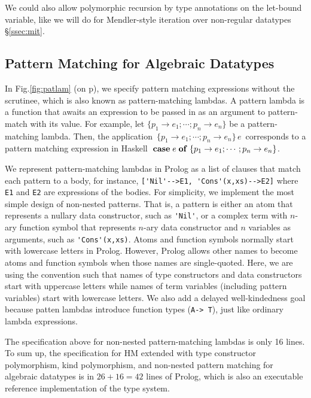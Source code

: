 \documentclass[runningheads,a4paper]{llncs}
\begin{document}
We could also allow polymorphic recursion by type annotations
on the let-bound variable, like we will do for Mendler-style iteration
over non-regular datatypes \S\ref{ssec:mit}.


\subsection{Pattern Matching for Algebraic Datatypes}\label{ssec:patlam}
In Fig.\ref{fig:patlam} (on p\pageref{fig:patlam}), we specify
pattern matching expressions without the scrutinee, which is
also known as pattern-matching lambdas. A pattern lambda is
a function that awaits an expression to be passed in
as an argument to pattern-match with its value. For example,
let $\{p_1\to e_1;\cdots; p_n\to e_n\}$ be a pattern-matching lambda.
Then, the application $\,\{p_1\to e_1;\cdots; p_n\to e_n\}\,e\,$
corresponds to a pattern matching expression in Haskell
${\bf\;case}\;e\;{\bf of}\;\{p_1\to e_1;\cdots; p_n\to e_n\}$.

We represent pattern-matching lambdas in Prolog as a list of clauses
that match each pattern to a body, for instance,
\verb|['Nil'-->E1, 'Cons'(x,xs)-->E2]|
where \verb|E1| and \verb|E2| are expressions of the bodies. For simplicity,
we implement the most simple design of non-nested patterns. That is,
a pattern is either an atom that represents a nullary data constructor,
such as \verb|'Nil'|, or a complex term with $n$-ary function symbol
that represents $n$-ary data constructor and $n$ variables as arguments,
such as \verb|'Cons'(x,xs)|.
Atoms and function symbols normally start with lowercase letters in Prolog.
However, Prolog allows other names to become atoms and function symbols
when those names are single-quoted. Here, we are using the convention
such that names of type constructors and data constructors start with 
uppercase letters while names of term variables (including pattern variables)
start with lowercase letters. We also add a delayed well-kindedness goal
because patten lambdas introduce function types (\verb|A-> T|), just like
ordinary lambda expressions.

The specification above for non-nested pattern-matching lambdas
is only 16 lines. To sum up, the specification for HM extended
with type constructor polymorphism, kind polymorphism, and
non-nested pattern matching for algebraic datatypes is in $26+16=42$
lines of Prolog, which is also an executable reference implementation
of the type system.
\end{document}
